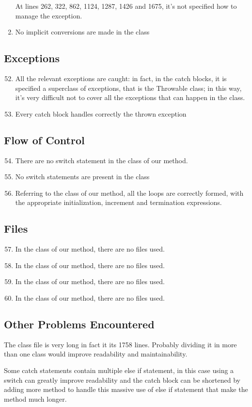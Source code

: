 \begin{enumerate}
    At lines 262, 322, 862, 1124, 1287, 1426 and 1675, it's not specified how to manage the exception.
	\item No implicit conversions are made in the class
\end{enumerate}
\subsection{Exceptions}
\begin{enumerate}
	\setcounter{enumi}{51}
	\item All the relevant exceptions are caught: in fact, in the catch blocks, it is specified a superclass of exceptions, that is the Throwable class; in this way, it's very difficult not to cover all the exceptions that can happen in the class.
	\item Every catch block handles correctly the thrown exception
\end{enumerate}
\subsection{Flow of Control}
\begin{enumerate}
	\setcounter{enumi}{53}
	\item There are no switch statement in the class of our method.
	\item No switch statements are present in the class
	\item Referring to the class of our method, all the loops are correctly formed, with the appropriate initialization, increment and termination expressions.
\end{enumerate}
\subsection{Files}
\begin{enumerate}
	\setcounter{enumi}{56}
	\item In the class of our method, there are no files used.
	\item In the class of our method, there are no files used.
	\item In the class of our method, there are no files used.
	\item In the class of our method, there are no files used.
\end{enumerate}
\subsection{Other Problems Encountered}
	The class file is very long in fact it its 1758 lines. Probably dividing it in more than one class would improve readability and maintainability.
	
	Some catch statements contain multiple \ttfamily else if \normalfont statement, in this case using a switch can greatly improve readability and the catch block can be shortened by adding more method to handle this massive use of else if statement that make the method much longer.